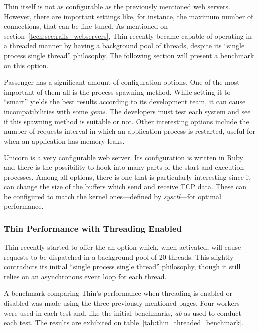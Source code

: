 Thin itself is not as configurable as the previously mentioned web servers. However, there are important settings like, for instance, the maximum number of connections, that can be fine-tuned. As mentioned on section~\ref{tech:sec:rails_webservers}, Thin recently became capable of operating in a threaded manner by having a background pool of threads, despite its ``single process single thread'' philosophy. The following section will present a benchmark on this option.

Passenger has a significant amount of configuration options. One of the most important of them all is the process spawning method. While setting it to ``smart'' yields the best results according to its development team, it can cause incompatibilities with some \textit{gems}. The developers must test each system and see if this spawning method is suitable or not. Other interesting options include the number of requests interval in which an application process is restarted, useful for when an application has memory leaks.

Unicorn is a very configurable web server. Its configuration is written in Ruby and there is the possibility to hook into many parts of the start and execution processes. Among all options, there is one that is particularly interesting since it can change the size of the buffers which send and receive TCP data. These can be configured to match the kernel ones---defined by \textit{sysctl}---for optimal performance.

\subsubsection{Thin Performance with Threading Enabled}
Thin recently started to offer the an option which, when activated, will cause requests to be dispatched in a background pool of 20 threads. This slightly contradicts its initial ``single process single thread'' philosophy, though it still relies on an asynchronous event loop for each thread.

A benchmark comparing Thin's performance when threading is enabled or disabled was made using the three previously mentioned pages. Four workers were used in each test and, like the initial benchmarks, \textit{ab} as used to conduct each test. The results are exhibited on table~\ref{tab:thin_threaded_benchmark}.

